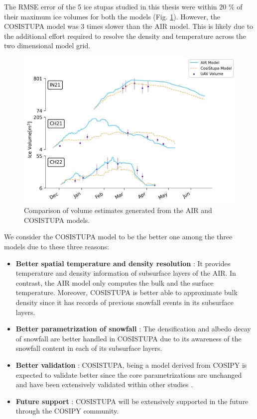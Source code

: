 The \ac{RMSE} error of the 5 ice stupas studied in this thesis were within 20 \% of their maximum ice volumes
for both the models (Fig. \ref{fig:Cosistupa}).  However, the COSISTUPA model was 3 times slower than the AIR
model. This is likely due to the additional effort required to resolve the density and temperature across the
two dimensional model grid.

\begin{figure}[t]
	\centering
	\includegraphics[width=\textwidth]{figs/model_compare.jpg}

	\caption{Comparison of volume estimates generated from the AIR and COSISTUPA models.}

	\label{fig:Cosistupa}
\end{figure}

We consider the COSISTUPA model to be the better one among the three models due to these three reasons:

\begin{itemize}

	\item \textbf{Better spatial temperature and density resolution} : It provides temperature and density
	      information of subsurface layers of the AIR. In contrast, the AIR model only computes the bulk and the
	      surface temperature. Moreover, COSISTUPA is better able to approximate bulk density since it has records of
	      previous snowfall events in its subsurface layers.

	\item \textbf{Better parametrization of snowfall} : The densification and albedo decay of snowfall are better
	      handled in COSISTUPA due to its awareness of the snowfall content in each of its subsurface layers.

	\item \textbf{Better validation} : COSISTUPA, being a model derived from COSIPY is expected to validate better
	      since the core parametrizations are unchanged and have been extensively validated within other studies \citep{arndtAtmosphereDrivenMassBalance2021}.

	\item \textbf{Future support} : COSISTUPA will be extensively supported in the future through the COSIPY
	      community.

\end{itemize}


